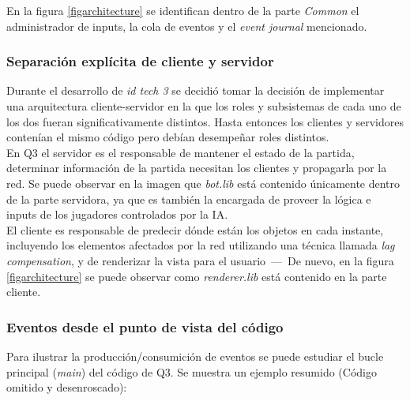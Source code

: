 \documentclass[a4paper,12pt]{report}
\begin{document}
	En la figura \ref{figarchitecture} se identifican dentro de la parte \textit{Common} el administrador de inputs, la cola de eventos y el \textit{event journal} mencionado.
	
	\subsubsection{Separación explícita de cliente y servidor}
	
	Durante el desarrollo de \textit{id tech 3} se decidió tomar la decisión de implementar una arquitectura cliente-servidor en la que los roles y subsistemas de cada uno de los dos fueran significativamente distintos. Hasta entonces los clientes y servidores contenían el mismo código pero debían desempeñar roles distintos.\\
	
	En Q3 el servidor es el responsable de mantener el estado de la partida, determinar información de la partida necesitan los clientes y propagarla por la red. Se puede observar en la imagen que \textit{bot.lib} está contenido únicamente dentro de la parte servidora, ya que es también la encargada de proveer la lógica e inputs de los jugadores controlados por la IA.\\
	
	El cliente es responsable de predecir dónde están los objetos en cada instante, incluyendo los elementos afectados por la red utilizando una técnica llamada \textit{lag compensation}, y de renderizar la vista para el usuario \,---\, De nuevo, en la figura  \ref{figarchitecture} se puede observar como \textit{renderer.lib} está contenido en la parte cliente. \cite{architecture}\\
	
	\subsubsection{Eventos desde el punto de vista del código}
	
	Para ilustrar la producción/consumición de eventos se puede estudiar el bucle principal (\textit{main}) del código de Q3. Se muestra un ejemplo resumido (Código omitido y desenroscado):
	
\end{document}
